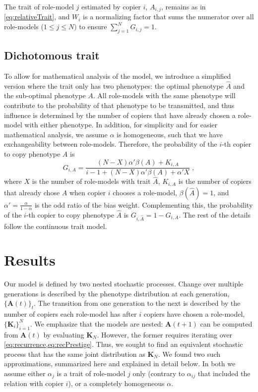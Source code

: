 \documentclass[12pt]{extarticle}
\let\vec\mathbf
\begin{document}
The trait of role-model $j$ estimated by copier $i$, $A_{i,j}$, remains as in \cref{eq:relativeTrait}, and $W_i$ is a normalizing factor that sums the numerator over all role-models ($1\le j \le N)$ to ensure $\sum_{j=1}^{N}{G_{i,j}}=1$.



\subsection*{Dichotomous trait}
To allow for mathematical analysis of the model, we introduce a simplified version where the trait only has two phenotypes: the optimal phenotype $\hat{A}$ and the sub-optimal phenotype $A$. 
All role-models with the same phenotype will contribute to the probability of that phenotype to be transmitted, and thus influence is determined by the number of copiers that have already chosen a role-model with either phenotype.
In addition, for simplicity and for easier mathematical analysis, we assume $\alpha$ is homogeneous, such that we have exchangeability between role-models.
Therefore, the probability of the $i$-th copier to copy phenotype $A$ is
\begin{equation}\label{eq:binary-model}
G_{i,A} = \frac{(N-X)\alpha'\beta(A) + K_{i,A}}{i-1 + (N-X)\alpha'\beta(A) + \alpha'X} \;,
\end{equation}
where $X$ is the number of role-models with trait $\hat{A}$, $K_{i,A}$ is the number of copiers that already chose $A$ when copier $i$ chooses a role-model, $\beta(\hat{A})=1$, and $\alpha'= \frac{\alpha}{1-\alpha}$ is the odd ratio of the bias weight. Complementing this, the probability of the $i$-th copier to copy phenotype $\hat{A}$ is $G_{i, \hat{A}} = 1-G_{i,A}$.
The rest of the details follow the continuous trait model.


\section*{Results}
Our model is defined by two nested stochastic processes. Change over multiple generations is described by the phenotype distribution at each generation, $\{\vec{A}(t)\}_t$. The transition from one generation to the next is described by the number of copiers each role-model has after $i$ copiers have chosen a role-model, $\{\vec{K}_i\}_{i=1}^N$.
We emphasize that the models are nested: $\vec{A}(t+1)$ can be computed from $\vec{A}(t)$ by evaluating $\vec{K}_{N}$. However, the former requires iterating over \cref{eq:recurrence,eq:recPrestige}.
Thus, we sought to find an equivalent stochastic process that has the same joint distribution as $\vec{K}_{N}$. 
We found two such approximations, summarized here and explained in detail below. In both we assume either $\alpha_j$ is a trait of role-model $j$ only (contrary to $\alpha_{ij}$ that included the relation with copier $i$), or a completely homogeneous $\alpha$.
\end{document}
